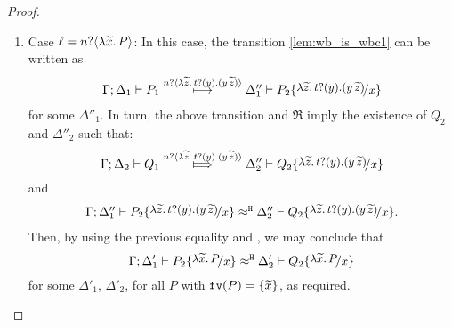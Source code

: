 \begin{proof}
\begin{enumerate}[1.]
		\item	Case $\ell = n ? \langle \lambda \widetilde{x}.\,P \rangle$: In this case, the transition \eqref{lem:wb_is_wbc1} can be written as 
				\[
					\begin{array}{l}
						\horel{\Gamma}{\Delta_1}{P_1}{\hby{\bactinp{n}{\auxtr{t}}}}{\Delta_1''}{P_2 \subst{\auxtr{t}}{x}}
					\end{array}
				\]
				for some $\Delta''_1$.
			In turn, the above transition and $\Re$ imply the existence of $Q_2$ and $\Delta''_2$ such that:
			\[
					\horel{\Gamma}{\Delta_2}{Q_1}{\Hby{\bactinp{n}{\auxtr{t}}}}{\Delta_2''}{Q_2 \subst{\auxtr{t}}{x}}
			\]
				\noi and
			\[
				\begin{array}{l}
					\horel{\Gamma}{\Delta_1''}{P_2 \subst{\auxtr{t}}{x}}{\hwb}{\Delta_2''}{Q_2 \subst{\auxtr{t}}{x}}.
				\end{array}
			\]
			 Then, by using the previous equality and , we may conclude
				 that
			\[
				\horel{\Gamma}{\Delta_1'}{P_2 \subst{\abs{\widetilde{x}}{P}}{x}}{\hwb}{\Delta_2'}{Q_2 \subst{\abs{\widetilde{x}}{P}}{x}}
			\]
			for some $\Delta'_1$, $\Delta'_2$,
			for all $P$ with $\mathtt{fv}(P) = \{\widetilde{x}\}$, as required. %


\end{enumerate}
\end{proof}
